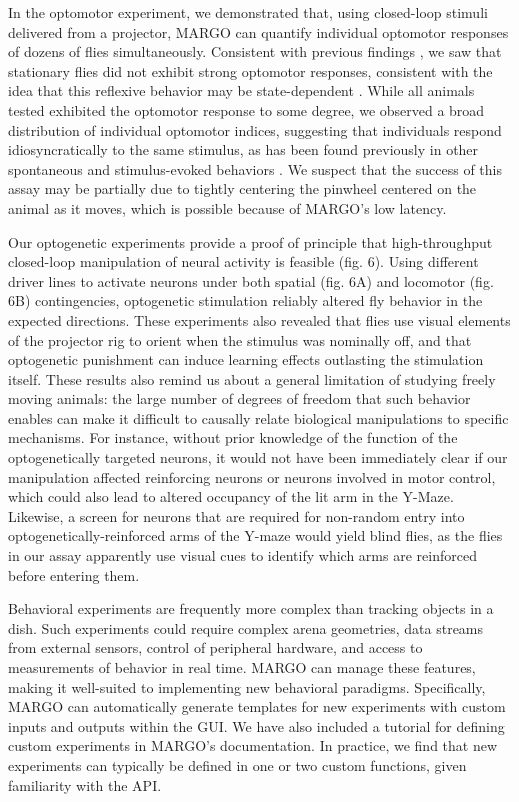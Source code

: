 \documentclass[10pt]{article}
\begin{document}
\begin{multicols}{2}
In the optomotor experiment, we demonstrated that, using closed-loop stimuli delivered from a projector, MARGO can quantify individual optomotor responses of dozens of flies simultaneously. Consistent with previous findings \citep{Zhu_Peripheral_2009,Kim_Fly_2016}, we saw that stationary flies did not exhibit strong optomotor responses, consistent with the idea that this reflexive behavior may be state-dependent \citep{Rosner_Behavioural_2009, Rien_Octopaminergic_2013, Chiappe_Walking_2010, Maimon_Active_2010,gorostiza_2018}. While all animals tested exhibited the optomotor response to some degree, we observed a broad distribution of individual optomotor indices, suggesting that individuals respond idiosyncratically to the same stimulus, as has been found previously in other spontaneous and stimulus-evoked behaviors \citep{Kain_Phototactic_2012,Kain_Leg_2013,Kain_Variability_2015,Buchanan_Neuronal_2015,Todd_Systematic_2017}. We suspect that the success of this assay may be partially due to tightly centering the pinwheel centered on the animal as it moves, which is possible because of MARGO's low latency.

Our optogenetic experiments provide a proof of principle that high-throughput closed-loop manipulation of neural activity is feasible (fig. 6). Using different driver lines to activate neurons under both spatial (fig. 6A) and locomotor (fig. 6B) contingencies, optogenetic stimulation reliably altered fly behavior in the expected directions. These experiments also revealed that flies use visual elements of the projector rig to orient when the stimulus was nominally off, and that optogenetic punishment can induce learning effects outlasting the stimulation itself. These results also remind us about a general limitation of studying freely moving animals: the large number of degrees of freedom that such behavior enables can make it difficult to causally relate biological manipulations to specific mechanisms. For instance, without prior knowledge of the function of the optogenetically targeted neurons, it would not have been immediately clear if our manipulation affected reinforcing neurons or neurons involved in motor control, which could also lead to altered occupancy of the lit arm in the Y-Maze. Likewise, a screen for neurons that are required for non-random entry into optogenetically-reinforced arms of the Y-maze would yield blind flies, as the flies in our assay apparently use visual cues to identify which arms are reinforced before entering them.

Behavioral experiments are frequently more complex than tracking objects in a dish. Such experiments could require complex arena geometries, data streams from external sensors, control of peripheral hardware, and access to measurements of behavior in real time. MARGO can manage these features, making it well-suited to implementing new behavioral paradigms. Specifically, MARGO can automatically generate templates for new experiments with custom inputs and outputs within the GUI. We have also included a tutorial for defining custom experiments in MARGO's documentation. In practice, we find that new experiments can typically be defined in one or two custom functions, given familiarity with the API.


\end{multicols}
\end{document}
